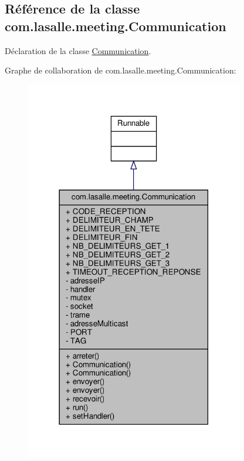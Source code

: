 \hypertarget{classcom_1_1lasalle_1_1meeting_1_1_communication}{}\subsection{Référence de la classe com.\+lasalle.\+meeting.\+Communication}
\label{classcom_1_1lasalle_1_1meeting_1_1_communication}


Déclaration de la classe \hyperlink{classcom_1_1lasalle_1_1meeting_1_1_communication}{Communication}.  




Graphe de collaboration de com.\+lasalle.\+meeting.\+Communication\+:
\nopagebreak
\begin{figure}[H]
\begin{center}
\leavevmode
\includegraphics[width=270pt]{classcom_1_1lasalle_1_1meeting_1_1_communication__coll__graph}
\end{center}
\end{figure}
